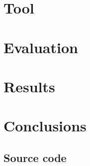 \documentclass{scrreprt}
\begin{document}
\chapter{Tool}


\cite{Kordy2013a}

\chapter{Evaluation}



\chapter{Results}

\chapter{Conclusions}




\newpage
\begin{appendices}

\section{Source code}

\end{appendices}
\end{document}
